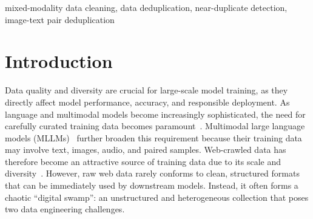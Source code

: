 \documentclass[conference]{IEEEtran}
\begin{document}
\begin{abstract}
\end{abstract}

\begin{IEEEkeywords}
mixed-modality data cleaning, data deduplication, near-duplicate detection, image-text pair deduplication
\end{IEEEkeywords}

\section{Introduction}

Data quality and diversity are crucial for large-scale model training, as they directly affect model performance, accuracy, and responsible deployment. As language and multimodal models become increasingly sophisticated, the need for carefully curated training data becomes paramount~\cite{TrainLLM, TrainingLLM2024}. Multimodal large language models (MLLMs)~\cite{Yin2024, Zhang2024} further broaden this requirement because their training data may involve text, images, audio, and paired samples. Web-crawled data has therefore become an attractive source of training data due to its scale and diversity~\cite{raffel2020exploring, gao2020pile}. However, raw web data rarely conforms to clean, structured formats that can be immediately used by downstream models. Instead, it often forms a chaotic ``digital swamp'': an unstructured and heterogeneous collection that poses two data engineering challenges.
\end{document}
